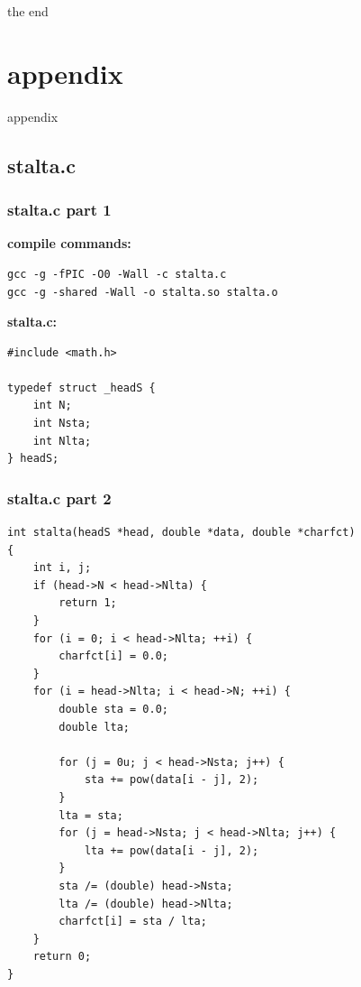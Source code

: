 \documentclass[utf8, compress, hyperref={pdftex=true,pdfpagemode=FullScreen}, graphicx={pdftex}]{beamer}
\begin{document}
\begin{frame}[fragile]
    \begin{center}
    \Huge{the end}
    \end{center}
\end{frame}

\appendix
\section{appendix}

\begin{frame}[fragile]
    \begin{center}
    \Huge{appendix}
    \end{center}
\end{frame}

\subsection{stalta.c}
\begin{frame}[fragile]
    \frametitle{stalta.c part 1}
    \textbf{compile commands:}
    \begin{lstlisting}
gcc -g -fPIC -O0 -Wall -c stalta.c
gcc -g -shared -Wall -o stalta.so stalta.o
    \end{lstlisting}
    \textbf{stalta.c:}
    \begin{lstlisting}[basicstyle=\ttfamily\tiny]
#include <math.h>

typedef struct _headS {
    int N;
    int Nsta;
    int Nlta;
} headS;
    \end{lstlisting}
\end{frame}

\begin{frame}[fragile]
    \frametitle{stalta.c part 2}
    \begin{lstlisting}[basicstyle=\ttfamily\tiny]
int stalta(headS *head, double *data, double *charfct)
{
    int i, j;
    if (head->N < head->Nlta) {
        return 1;
    }
    for (i = 0; i < head->Nlta; ++i) {
        charfct[i] = 0.0;
    }
    for (i = head->Nlta; i < head->N; ++i) {
        double sta = 0.0;
        double lta;

        for (j = 0u; j < head->Nsta; j++) {
            sta += pow(data[i - j], 2);
        }
        lta = sta;
        for (j = head->Nsta; j < head->Nlta; j++) {
            lta += pow(data[i - j], 2);
        }
        sta /= (double) head->Nsta;
        lta /= (double) head->Nlta;
        charfct[i] = sta / lta;
    }
    return 0;
}
    \end{lstlisting}
\end{frame}
\end{document}
